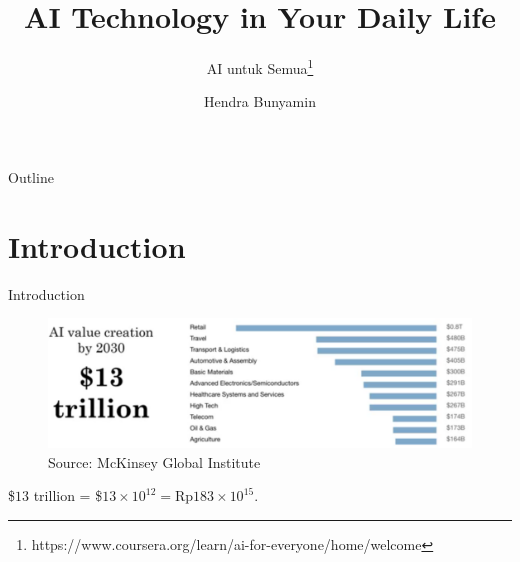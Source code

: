 \documentclass[pdf]{beamer}
\title[AI untuk Semua] %
{\textbf{AI Technology in Your Daily Life}}
\subtitle
{AI untuk Semua\footnote{https://www.coursera.org/learn/ai-for-everyone/home/welcome}}
\author[Hendra Bunyamin] %
{Hendra Bunyamin}
\institute[ ] %
{
  Jurusan Teknik Informatika\\
  Fakultas Teknologi Informasi\\
  Universitas Kristen Maranatha
}
\theoremstyle{mystyle}
\begin{document}
\begin{frame}
  \titlepage
\end{frame}

\begin{frame}{Outline}
  \tableofcontents
\end{frame}






\section{Introduction}
\begin{frame}{Introduction}
	\begin{figure}[!ht]
		\centering
		\includegraphics[scale=.225]{AI-value-creation}
		\caption{Source: McKinsey Global Institute~\citep{ng2019AIForEveryone}}
		\label{fig:ai-value-creation}
	\end{figure}
	\$$13$ trillion = \$$13 \times 10^{12} = \text{Rp}183 \times 10^{15}$. 
\end{frame}
\end{document}
